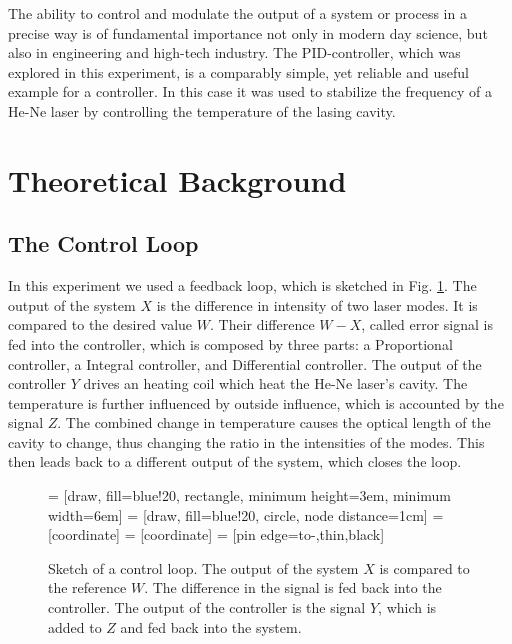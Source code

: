 \documentclass[a4paper,10pt]{article}
\begin{document}
The ability to control and modulate the output of a system or process in a precise way is of fundamental importance not only in modern day science, but also in engineering and high-tech industry. The PID-controller, which was explored in this experiment, is a comparably simple, yet reliable and useful example for a controller. In this case it was used to stabilize the frequency of a He-Ne laser by controlling the temperature of the lasing cavity.

\section{Theoretical Background}
\label{theory}
\subsection{The Control Loop}
In this experiment we used a feedback loop, which is sketched in Fig. \ref{fig_control_loop}. The output of the system $X$ is the difference in intensity of two laser modes. It is compared to the desired value $W$. Their difference $W-X$, called error signal is fed into the controller, which is composed by three parts: a Proportional controller, a Integral controller, and Differential controller. The output of the controller $Y$ drives an heating coil which heat the He-Ne laser's cavity. The temperature is further influenced by outside influence, which is accounted by the signal $Z$. The combined change in temperature causes the optical length of the cavity to change, thus changing the ratio in the intensities of the modes. This then leads back to a different output of the system, which closes the loop.
\begin{figure}[htp!]
    \centering
     = [draw, fill=blue!20, rectangle,
    minimum height=3em, minimum width=6em]
     = [draw, fill=blue!20, circle, node distance=1cm]
     = [coordinate]
     = [coordinate]
     = [pin edge={to-,thin,black}]

\caption{Sketch of a control loop. The output of the system $X$ is compared to the reference $W$. The difference in the signal is fed back into the controller. The output of the controller is the signal $Y$, which is added to $Z$ and fed back into the system. }
\label{fig_control_loop}
\end{figure}
\end{document}
